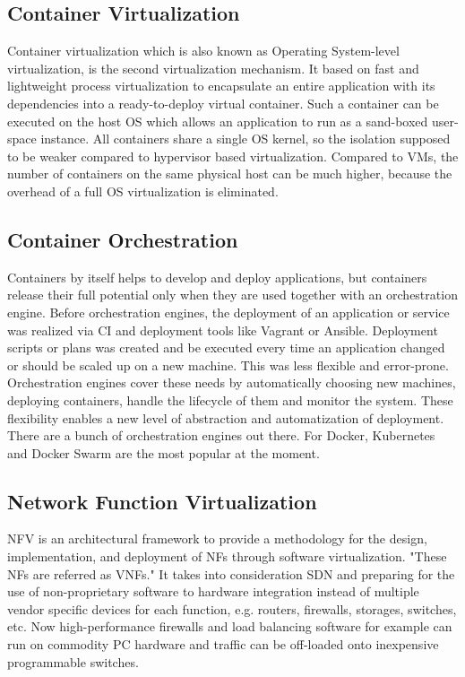 \subsection{Container Virtualization}
Container virtualization which is also known as Operating System-level virtualization, is the second virtualization mechanism.
It based on fast and lightweight process virtualization to encapsulate an entire application with its dependencies into a ready-to-deploy virtual container.\cite[cf.][p. 72]{Tosatto:2015}
Such a container can be executed on the host \ac{OS} which allows an application to run as a sand-boxed user-space instance.\cite[cf.][p. 1]{Anderson:2016}
All containers share a single \ac{OS} kernel, so the isolation supposed to be weaker compared to hypervisor based virtualization.\cite[cf.][p. 2]{Celesti:2016}
Compared to \acp{VM}, the number of containers on the same physical host can be much higher, because the overhead of a full \ac{OS} virtualization is eliminated.\cite[cf.][p. 2]{Celesti:2016}


\subsection{Container Orchestration}
Containers by itself helps to develop and deploy applications, but containers release their full potential only when they are used together with an orchestration engine.
Before orchestration engines, the deployment of an application or service was realized via \ac{CI} and deployment tools like Vagrant or Ansible.
Deployment scripts or plans was created and be executed every time an application changed or should be scaled up on a new machine.
This was less flexible and error-prone.
Orchestration engines cover these needs by automatically choosing new machines, deploying containers, handle the lifecycle of them and monitor the system.
These flexibility enables a new level of abstraction and automatization of deployment.
There are a bunch of orchestration engines out there.
For Docker, Kubernetes and Docker Swarm are the most popular at the moment.


\subsection{Network Function Virtualization}
\ac{NFV} is an architectural framework to provide a methodology for the design, implementation, and deployment of \acp{NF} through software virtualization.\cite[cf.][p. 8]{ETSI:NFV:2013}\cite[cf.]{Rivenes:2014}
"These \acp{NF} are referred as \acp{VNF}."\cite[p. 8]{ETSI:NFV:2013}
It takes into consideration \ac{SDN} and preparing for the use of non-proprietary software to hardware integration instead of multiple vendor specific devices for each function, e.g. routers, firewalls, storages, switches, etc.\cite[cf.]{Rivenes:2014}
Now high-performance firewalls and load balancing software for example can run on commodity PC hardware and traffic can be off-loaded onto inexpensive programmable switches.\cite[cf.]{Noble:2015}

